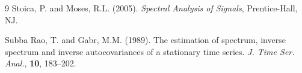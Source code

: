 \documentclass[twoside]{article}
\begin{document}
\begin{thebibliography}{9}
Stoica, P. and Moses, R.L. (2005). \textit{Spectral Analysis of Signals}, Prentice-Hall, NJ.



Subba Rao, T. and Gabr, M.M. (1989). The estimation of spectrum, inverse spectrum and inverse autocovariances of a stationary time series. \textit{J. Time Ser. Anal.}, \textbf{10}, 183--202.



\end{thebibliography}
 
\end{document}
